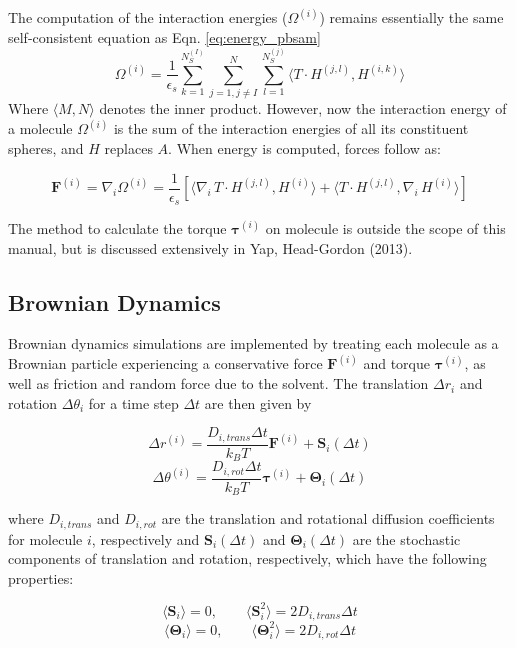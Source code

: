 The computation of the interaction energies ($\Omega^{(i)}$) remains essentially the same self-consistent equation 
as Eqn. \ref{eq:energy_pbsam}
\begin{equation}
	\Omega^{(i)}=\frac{1}{\epsilon_s} \sum_{k=1}^{N_S^{(I)}}  \sum_{j=1, j\ne I}^{N} \sum_{l=1}^{N_S^{(j)}} 
		\langle  {{T}} \cdot {H}^{(j,l)} ,  {H}^{(i,k)} \rangle
	\label{eq:energy_pbsam}
\end{equation}
 Where $\langle  M, N \rangle$ denotes the inner product. However, now the interaction 
 energy of a molecule $\Omega^{(i)}$ is the sum of the 
interaction energies of all its constituent spheres, and \({H}\) replaces \({A}\).
When energy is computed, forces follow as:

\[ \textbf{F}^{(i)} = \nabla_i \Omega^{(i)}=\frac{1}{\epsilon_s} [ \langle \nabla_i \,T \cdot H^{(j,l) } , 
 H^{(i) } \rangle +  \langle T \cdot H^{(j,l) } ,   \nabla_i \, H^{(i) } \rangle ]\]

The method to calculate the torque $\boldsymbol{\tau}^{(i)}$ on molecule is outside the 
scope of this manual, but is discussed extensively in Yap, Head-Gordon (2013).

\subsection{Brownian Dynamics}

Brownian dynamics simulations are implemented by treating each molecule as a 
Brownian particle experiencing a conservative force $\textbf{F}^{(i)}$ and torque 
$\boldsymbol{\tau}^{(i)}$, as well as friction and random force due to the solvent. The 
translation $\Delta r_i$ and rotation $\Delta \theta_i$ for a time step $\Delta t$ are then given by

\[\Delta r^{(i)} = \frac{D_{i, trans} \Delta t}{k_B T} \textbf{F}^{(i)} + \textbf{S}_i(\Delta t)\]
\[\Delta \theta^{(i)} = \frac{D_{i, rot} \Delta t}{k_B T} \boldsymbol{\tau}^{(i)} + \boldsymbol{\Theta}_i(\Delta t)\]

where $D_{i, trans}$ and $D_{i, rot}$ are the translation and rotational diffusion coefficients 
for molecule $i$, respectively and $\textbf{S}_i(\Delta t)$ and $\boldsymbol{\Theta}_i(\Delta t)$ 
are the stochastic components of translation and rotation, respectively, which have the following properties:

\[\langle \textbf{S}_i \rangle=0, \qquad \langle \textbf{S}_i^2 \rangle=2D_{i, trans}\Delta t\]
\[\langle \boldsymbol{\Theta}_i \rangle=0, \qquad \langle \boldsymbol{\Theta}_i^2 \rangle=2D_{i, rot}\Delta t\]

